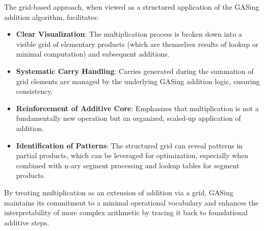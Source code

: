 The grid-based approach, when viewed as a structured application of the GASing addition algorithm, facilitates:
\begin{itemize}
\item \textbf{Clear Visualization}: The multiplication process is broken down into a visible grid of elementary products (which are themselves results of lookup or minimal computation) and subsequent additions.
\item \textbf{Systematic Carry Handling}: Carries generated during the summation of grid elements are managed by the underlying GASing addition logic, ensuring consistency.
\item \textbf{Reinforcement of Additive Core}: Emphasizes that multiplication is not a fundamentally new operation but an organized, scaled-up application of addition.
\item \textbf{Identification of Patterns}: The structured grid can reveal patterns in partial products, which can be leveraged for optimization, especially when combined with n-ary segment processing and lookup tables for segment products.

\end{itemize}
By treating multiplication as an extension of addition via a grid, GASing maintains its commitment to a minimal operational vocabulary and enhances the interpretability of more complex arithmetic by tracing it back to foundational additive steps.
